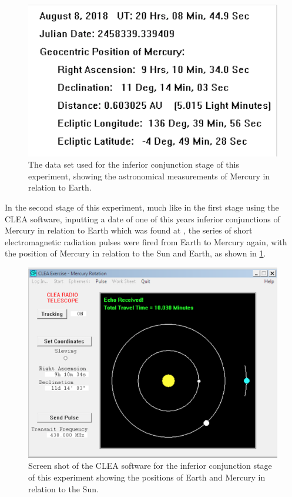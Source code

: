 \documentclass[11pt]{article}
\begin{document}
\begin{multicols}{2}
\begin{figure}[H]
\centering
\includegraphics[scale=0.6]{Inferior_Images.png/Data_Set.png}
\caption{The data set used for the inferior conjunction stage of this experiment, showing the astronomical measurements of Mercury in relation to Earth.}
\label{2-Data Set}
\end{figure}

In the second stage of this experiment, much like in the first stage  using the CLEA software, inputting a date of one of this years inferior conjunctions of Mercury in relation to Earth which was found at \cite{astropixels.com}, the series of short electromagnetic radiation pulses were fired from Earth to Mercury again, with the position of Mercury in relation to the Sun and Earth, as shown in \cref{2-Data Set}. \\

\begin{figure}[H]
\centering
\includegraphics[scale=0.4]{Inferior_Images.png/CLEA_Software.png}
\caption{Screen shot of the CLEA software for the inferior conjunction stage of this experiment showing the positions of Earth and Mercury in relation to the Sun.}
\label{2-CLEA Software}
\end{figure}


\end{multicols}
\end{document}
